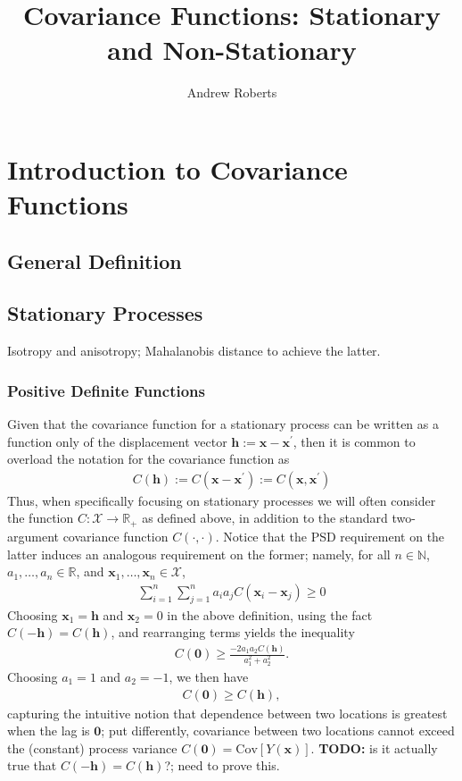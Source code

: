 \documentclass[12pt]{article}
\title{Covariance Functions: Stationary and Non-Stationary}
\author{Andrew Roberts}
\newcommand{\R}{\mathbb{R}}
\newcommand{\Cov}{\mathrm{Cov}}
\newcommand{\zeroVec}{\mathbf{0}}
\newcommand{\covFun}{C}
\newcommand{\locSpace}{\mathcal{X}}
\newcommand{\loc}{\mathbf{x}}
\newcommand{\locTwo}{\loc^\prime}
\newcommand{\locLag}{\mathbf{h}}
\newcommand{\rf}{Y}
\begin{document}
\maketitle
\tableofcontents
\newpage

\section{Introduction to Covariance Functions}

\subsection{General Definition}

\subsection{Stationary Processes}
Isotropy and anisotropy; Mahalanobis distance to achieve the latter. 

\subsubsection{Positive Definite Functions}
Given that the covariance function for a stationary process can be written as a function only of the 
displacement vector $\locLag := \loc - \locTwo$, then it is common to overload the notation for the covariance function as 
\begin{align}
\covFun(\locLag) := \covFun(\loc - \locTwo) := \covFun(\loc, \locTwo)
\end{align}
Thus, when specifically focusing on stationary processes we will often consider the function $\covFun: \locSpace \to \R_+$ as defined above, 
in addition to the standard two-argument covariance function $\covFun(\cdot, \cdot)$. Notice that the PSD requirement on the latter induces 
an analogous requirement on the former; namely, for all $n \in \mathbb{N}$, $a_1, \dots, a_n \in \R$, and $\loc_1, \dots, \loc_n \in \locSpace$, 
\begin{align}
\sum_{i = 1}^{n} \sum_{j = 1}^{n} a_i a_j \covFun(\loc_i - \loc_j) \geq 0
\end{align} 
Choosing $\loc_1 = \locLag$ and $\loc_2 = 0$ in the above definition, using the fact $\covFun(-\locLag) = \covFun(\locLag)$, and rearranging terms yields the inequality
\begin{align*}
\covFun(\zeroVec) \geq \frac{-2 a_1 a_2 \covFun(\locLag)}{a_1^2 + a_2^2}.
\end{align*}
Choosing $a_1 = 1$ and $a_2 = -1$, we then have 
\begin{align}
\covFun(\zeroVec) \geq \covFun(\locLag),
\end{align}
capturing the intuitive notion that dependence between two locations is greatest when the lag is $\zeroVec$; put differently, covariance between two locations cannot exceed the 
(constant) process variance $\covFun(\zeroVec) = \Cov[\rf(\loc)]$. \textbf{TODO:} is it actually true that $\covFun(-\locLag) = \covFun(\locLag)$?; need to prove this. 
\end{document}
